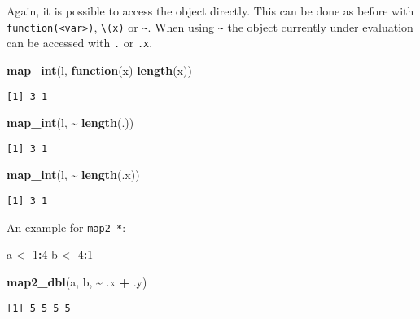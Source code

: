 \documentclass[ignorenonframetext,,t]{beamer}
\let\oldtextbf\textbf
\renewcommand{\textbf}[1]{\textcolor{spamwell}{\oldtextbf{#1}}}
\newenvironment{Shaded}{\begin{snugshade}}{\end{snugshade}}
\newcommand{\ControlFlowTok}[1]{\textcolor[rgb]{0.13,0.29,0.53}{\textbf{#1}}}
\newcommand{\DecValTok}[1]{\textcolor[rgb]{0.00,0.00,0.81}{#1}}
\newcommand{\FunctionTok}[1]{\textcolor[rgb]{0.13,0.29,0.53}{\textbf{#1}}}
\newcommand{\NormalTok}[1]{#1}
\newcommand{\OtherTok}[1]{\textcolor[rgb]{0.56,0.35,0.01}{#1}}
\newcommand{\SpecialCharTok}[1]{\textcolor[rgb]{0.81,0.36,0.00}{\textbf{#1}}}
\begin{document}
\begin{frame}[fragile]
Again, it is possible to access the object directly. This can be done as
before with \texttt{function(\textless{}var\textgreater{})},
\texttt{\textbackslash{}(x)} or \texttt{\textasciitilde{}}. When using
\texttt{\textasciitilde{}} the object currently under evaluation can be
accessed with \texttt{.} or \texttt{.x}.

\begin{Shaded}
\begin{Highlighting}[]
\FunctionTok{map\_int}\NormalTok{(l, }\ControlFlowTok{function}\NormalTok{(x) }\FunctionTok{length}\NormalTok{(x))}
\end{Highlighting}
\end{Shaded}

\begin{verbatim}
[1] 3 1
\end{verbatim}

\begin{Shaded}
\begin{Highlighting}[]
\FunctionTok{map\_int}\NormalTok{(l, }\SpecialCharTok{\textasciitilde{}} \FunctionTok{length}\NormalTok{(.))}
\end{Highlighting}
\end{Shaded}

\begin{verbatim}
[1] 3 1
\end{verbatim}

\begin{Shaded}
\begin{Highlighting}[]
\FunctionTok{map\_int}\NormalTok{(l, }\SpecialCharTok{\textasciitilde{}} \FunctionTok{length}\NormalTok{(.x))}
\end{Highlighting}
\end{Shaded}

\begin{verbatim}
[1] 3 1
\end{verbatim}
\end{frame}

\begin{frame}[fragile]
An example for \texttt{map2\_*}:

\begin{Shaded}
\begin{Highlighting}[]
\NormalTok{a }\OtherTok{\textless{}{-}} \DecValTok{1}\SpecialCharTok{:}\DecValTok{4}
\NormalTok{b }\OtherTok{\textless{}{-}} \DecValTok{4}\SpecialCharTok{:}\DecValTok{1}

\FunctionTok{map2\_dbl}\NormalTok{(a, b, }\SpecialCharTok{\textasciitilde{}}\NormalTok{ .x }\SpecialCharTok{+}\NormalTok{ .y)}
\end{Highlighting}
\end{Shaded}

\begin{verbatim}
[1] 5 5 5 5
\end{verbatim}
\end{frame}
\end{document}
